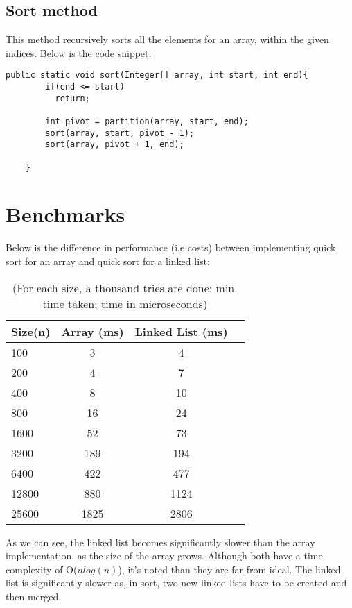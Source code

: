 \documentclass[a4paper,11pt]{article}
\begin{document}
\subsection*{Sort method}
This method recursively sorts all the elements for an array, within the given indices. Below is the code snippet:

\begin{verbatim}
public static void sort(Integer[] array, int start, int end){
        if(end <= start)
          return;
        
        int pivot = partition(array, start, end);
        sort(array, start, pivot - 1);
        sort(array, pivot + 1, end);
        
    }
\end{verbatim}

\section*{Benchmarks}
Below is the difference in performance (i.e costs) between implementing quick sort for an array and quick sort for a linked list:

\begin{table}[h]
\begin{center}
\begin{tabular}{l|c|c|c}
\textbf{Size(n)} & \textbf{Array (ms)} & \textbf{Linked List (ms)}\\
\hline
  100      &  3     &  4\\
  200      &  4     &  7\\
  400      &  8     &  10\\
  800      &  16     &  24\\
  1600      &  52     &  73\\
  3200      &  189     &  194\\
  6400      &  422     &  477\\
  12800      &  880     &  1124\\
  25600      &  1825     &  2806\\
\end{tabular}
\caption{(For each size, a thousand tries are done; min. time taken; time in microseconds)}
\label{tab:table1}
\end{center}
\end{table}

As we can see, the linked list becomes significantly slower than the array implementation, as the size of the array grows. Although both have a time complexity of O($nlog(n)$), it's noted than they are far from ideal. The linked list is significantly slower as, in sort, two new linked lists have to be created and then merged.
\end{document}
